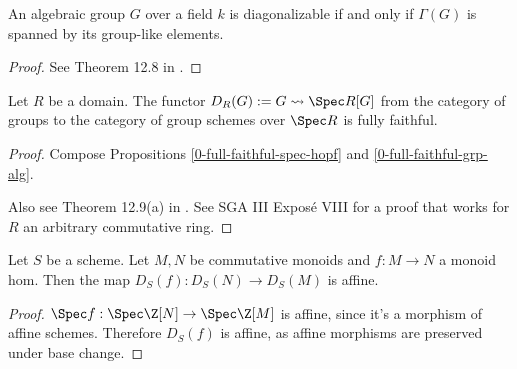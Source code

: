 \begin{theorem}
  \label{0-diag-iff-grp-like-span}
  \leanok

  An algebraic group $G$ over a field $k$ is diagonalizable if and only if $\Gamma(G)$ is spanned by its group-like elements.
\end{theorem}
\begin{proof}

  See Theorem 12.8 in \cite{Milne_2017}.
\end{proof}


\begin{theorem}
  \label{0-full-faithful-diag}
  \leanok

  Let $R$ be a domain.
  The functor $D_R(G) := G \rightsquigarrow \Spec R[G]$ from the category of groups to the category of group schemes over $\Spec R$ is fully faithful.
\end{theorem}
\begin{proof}
  \leanok

  Compose Propositions \ref{0-full-faithful-spec-hopf} and \ref{0-full-faithful-grp-alg}.

  Also see Theorem 12.9(a) in \cite{Milne_2017}. See SGA III Exposé VIII for a proof that works for $R$ an arbitrary commutative ring.
\end{proof}


\begin{proposition}
  \label{0-diag-aff-hom}

  Let $S$ be a scheme.
  Let $M, N$ be commutative monoids and $f : M \to N$ a monoid hom.
  Then the map $D_S(f) : D_S(N) \to D_S(M)$ is affine.
\end{proposition}
\begin{proof}

  $\Spec f : \Spec \Z[N] \to \Spec \Z[M]$ is affine, since it's a morphism of affine schemes.
  Therefore $D_S(f)$ is affine, as affine morphisms are preserved under base change.
\end{proof}


